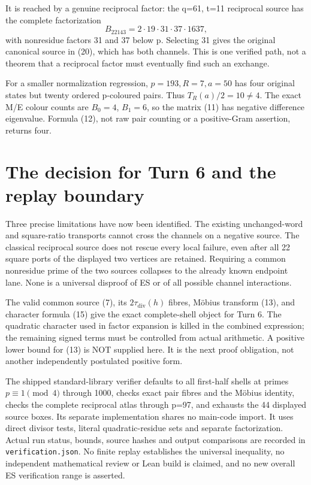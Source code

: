 It is reached by a genuine reciprocal factor: the q=61, t=11 reciprocal source
has the complete factorization
\[
 B_{22143}=2\cdot19\cdot31\cdot37\cdot1637,
\]
with nonresidue factors 31 and 37 below p. Selecting 31 gives the original
canonical source in (20), which has both channels. This is one verified path,
not a theorem that a reciprocal factor must eventually find such an exchange.

For a smaller normalization regression, $p=193,R=7,a=50$ has four original
states but twenty ordered p-coloured pairs. Thus $T_R(a)/2=10\ne4$.
The exact M/E colour counts are $B_0=4$, $B_1=6$, so the matrix (11) has
negative difference eigenvalue. Formula (12), not raw pair counting or a
positive-Gram assertion, returns four.

\section{The decision for Turn 6 and the replay boundary}
Three precise limitations have now been identified. The existing unchanged-word
and square-ratio transports cannot cross the channels on a negative source.
The classical reciprocal source does not rescue every local failure, even after
all 22 square ports of the displayed two vertices are retained. Requiring a common
nonresidue prime of the two sources collapses to the already known endpoint lane.
None is a universal disproof of ES or of all possible channel interactions.

The valid common source (7), its $2\tau_{\mathrm{div}}(h)$ fibres, M\"obius transform (13), and
character formula (15) give the exact complete-shell object for Turn 6.
The quadratic character used in factor expansion is killed in the combined
expression; the remaining signed terms must be controlled from actual arithmetic.
A positive lower bound for (13) is NOT supplied here. It is the next proof
obligation, not another independently postulated positive form.

The shipped standard-library verifier defaults to all first-half shells at primes
$p\equiv1\pmod4$ through 1000, checks exact pair fibres and the M\"obius identity,
checks the complete reciprocal atlas through p=97, and exhausts the 44 displayed
source boxes. Its separate implementation shares no main-code import. It uses
direct divisor tests, literal quadratic-residue sets and separate factorization.
Actual run status, bounds, source hashes and output comparisons are recorded in
\texttt{verification.json}. No finite replay establishes the universal inequality,
no independent mathematical review or Lean build is claimed, and no new overall
ES verification range is asserted.
